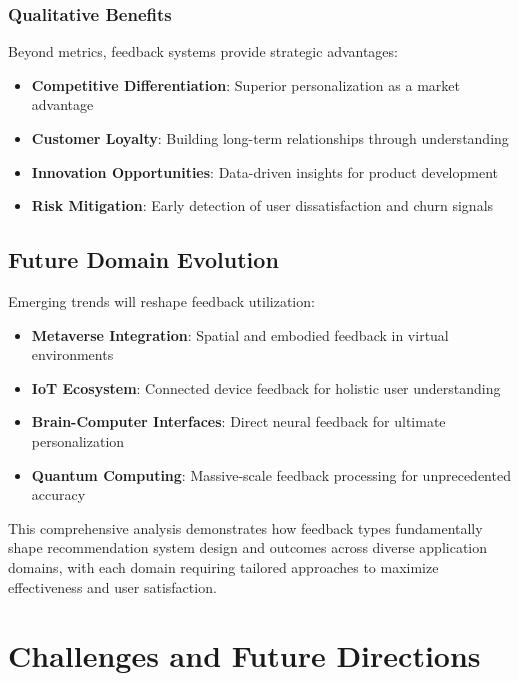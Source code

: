 \documentclass[acmsmall,review,anonymous]{acmart}
\begin{document}
\subsubsection{Qualitative Benefits}

Beyond metrics, feedback systems provide strategic advantages:

\begin{itemize}
    \item \textbf{Competitive Differentiation}: Superior personalization as a market advantage
    \item \textbf{Customer Loyalty}: Building long-term relationships through understanding
    \item \textbf{Innovation Opportunities}: Data-driven insights for product development
    \item \textbf{Risk Mitigation}: Early detection of user dissatisfaction and churn signals
\end{itemize}

\subsection{Future Domain Evolution}

Emerging trends will reshape feedback utilization:

\begin{itemize}
    \item \textbf{Metaverse Integration}: Spatial and embodied feedback in virtual environments
    \item \textbf{IoT Ecosystem}: Connected device feedback for holistic user understanding
    \item \textbf{Brain-Computer Interfaces}: Direct neural feedback for ultimate personalization
    \item \textbf{Quantum Computing}: Massive-scale feedback processing for unprecedented accuracy
\end{itemize}

This comprehensive analysis demonstrates how feedback types fundamentally shape recommendation system design and outcomes across diverse application domains, with each domain requiring tailored approaches to maximize effectiveness and user satisfaction.

\section{Challenges and Future Directions}
\label{sec:challenges}
\end{document}
